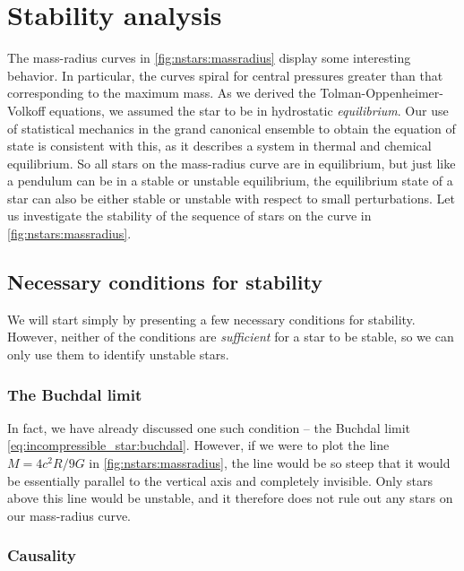\section{Stability analysis}

The mass-radius curves in \cref{fig:nstars:massradius} display some interesting behavior.
In particular, the curves spiral for central pressures greater than that corresponding to the maximum mass.
As we derived the Tolman-Oppenheimer-Volkoff equations, we assumed the star to be in hydrostatic \emph{equilibrium}.
Our use of statistical mechanics in the grand canonical ensemble to obtain the equation of state is consistent with this, as it describes a system in thermal and chemical equilibrium.
So all stars on the mass-radius curve are in equilibrium, but just like a pendulum can be in a stable or unstable equilibrium, the equilibrium state of a star can also be either stable or unstable with respect to small perturbations.
Let us investigate the stability of the sequence of stars on the curve in \cref{fig:nstars:massradius}.

\subsection{Necessary conditions for stability}
\label{sec:nstars:stability_necessary}

We will start simply by presenting a few necessary conditions for stability.
However, neither of the conditions are \emph{sufficient} for a star to be stable, so we can only use them to identify unstable stars.

\subsubsection{The Buchdal limit}

In fact, we have already discussed one such condition -- the Buchdal limit \eqref{eq:incompressible_star:buchdal}.
However, if we were to plot the line $M = 4 c^2 R / 9 G$ in \cref{fig:nstars:massradius}, the line would be so steep that it would be essentially parallel to the vertical axis and completely invisible.
Only stars above this line would be unstable, and it therefore does not rule out any stars on our mass-radius curve.

\subsubsection{Causality}

